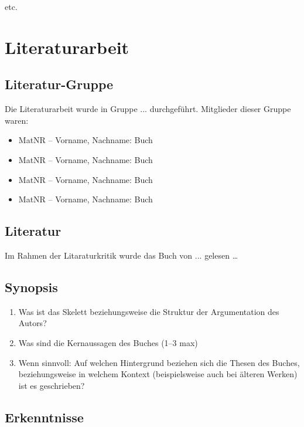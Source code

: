 \documentclass[twoside, a4paper, DIV=11, open=any, bibliography=totoc]{scrbook}
\begin{document}
etc.

\chapter{Literaturarbeit} \label{chp:LitKrit}

\section{Literatur-Gruppe} \label{sec:litgruppe}

Die Literaturarbeit wurde in Gruppe ... durchgeführt. Mitglieder dieser Gruppe waren:

\begin{itemize}
    \item MatNR – Vorname, Nachname: Buch
    \item MatNR – Vorname, Nachname: Buch
    \item MatNR – Vorname, Nachname: Buch
    \item MatNR – Vorname, Nachname: Buch
\end{itemize}


\section{Literatur} \label{sec:litlit}

Im Rahmen der Litaraturkritik wurde das Buch von ... gelesen \ldots

\section{Synopsis} \label{sec:litsynops}

\begin{enumerate}
    \item Was ist das Skelett beziehungsweise die Struktur der Argumentation des Autors?
    \item Was sind die Kernaussagen des Buches (1--3 max)
    \item Wenn sinnvoll: Auf welchen Hintergrund beziehen sich die Thesen des Buches, beziehungsweise in welchem Kontext (beispielsweise auch bei älteren Werken) ist es geschrieben?
\end{enumerate}

\section{Erkenntnisse} \label{sec:literkenntnis}
\end{document}
